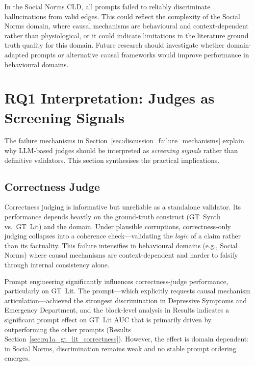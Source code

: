 In the Social Norms CLD, all prompts failed to reliably discriminate hallucinations from valid edges. This could reflect the complexity of the Social Norms domain, where causal mechanisms are behavioural and context-dependent rather than physiological, or it could indicate limitations in the literature ground truth quality for this domain. Future research should investigate whether domain-adapted prompts or alternative causal frameworks would improve performance in behavioural domains.

\section{RQ1 Interpretation: Judges as Screening Signals}
\label{sec:discussion_rq1a_correctness}
\label{sec:discussion_rq1a_citation}
\label{sec:discussion_judge_human_agreement}
The failure mechanisms in Section~\ref{sec:discussion_failure_mechanisms} explain why LLM-based judges should be interpreted as \emph{screening signals} rather than definitive validators. This section synthesises the practical implications.

\subsection{Correctness Judge}
Correctness judging is informative but unreliable as a standalone validator. Its performance depends heavily on the ground-truth construct (GT~Synth vs.\ GT~Lit) and the domain. Under plausible corruptions, correctness-only judging collapses into a coherence check---validating the \emph{logic} of a claim rather than its factuality. This failure intensifies in behavioural domains (e.g., Social Norms) where causal mechanisms are context-dependent and harder to falsify through internal consistency alone.

Prompt engineering significantly influences correctness-judge performance, particularly on GT~Lit. The \PromptMechanistic{} prompt---which explicitly requests causal mechanism articulation---achieved the strongest discrimination in Depressive Symptoms and Emergency Department, and the block-level analysis in Results indicates a significant prompt effect on GT~Lit AUC that is primarily driven by \PromptMechanistic{} outperforming the other prompts (Results Section~\ref{sec:rq1a_gt_lit_correctness}). However, the effect is domain dependent: in Social Norms, discrimination remains weak and no stable prompt ordering emerges.

